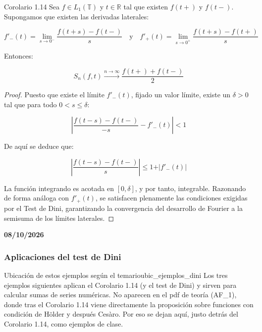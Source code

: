\begin{proposicion}{Corolario 1.14}{}
Sea $f \in L_1(\mathbb{T})$ y $t \in \mathbb{R}$ tal que existen $f(t+)$ y $f(t-)$. Supongamos que existen las derivadas laterales:


$$f'_-(t) = \lim_{s \to 0^-} \frac{f(t+s) - f(t-)}{s} \quad \text{y} \quad f'_+(t) = \lim_{s \to 0^+} \frac{f(t+s) - f(t+)}{s}$$


Entonces:


$$S_n(f,t) \xrightarrow{n \to \infty} \frac{f(t+) + f(t-)}{2}$$


\end{proposicion}

\begin{proof}
Puesto que existe el límite $f'_-(t)$, fijado un valor límite, existe un $\delta > 0$ tal que para todo $0 < s \le \delta$:


$$\left\vert{} \frac{f(t-s) - f(t-)}{-s} - f'_-(t) \right\vert{} < 1$$


De aquí se deduce que:


$$\left\vert{} \frac{f(t-s) - f(t-)}{s} \right\vert{} \le 1 + \vert{}f'_-(t)\vert{}$$


La función integrando es acotada en $[0, \delta]$, y por tanto, integrable. Razonando de forma análoga con $f'_+(t)$, se satisfacen plenamente las condiciones exigidas por el Test de Dini, garantizando la convergencia del desarrollo de Fourier a la semisuma de los límites laterales.
\end{proof}

\textbf{08/10/2026}

\subsubsection{Aplicaciones del test de Dini}

\begin{nota}{Ubicación de estos ejemplos según el temario}{ubic_ejemplos_dini}
Los tres ejemplos siguientes aplican el Corolario 1.14 (y el test de Dini) y sirven para calcular sumas de series numéricas. No aparecen en el pdf de teoría (AF\_1), donde tras el Corolario 1.14 viene directamente la proposición sobre funciones con condición de Hölder y después Cesàro. Por eso se dejan aquí, justo detrás del Corolario 1.14, como ejemplos de clase.
\end{nota}

